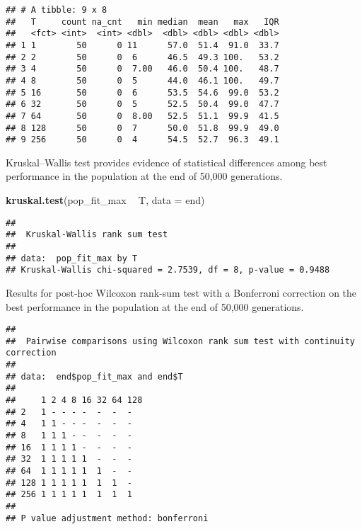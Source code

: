 \documentclass[]{book}
\newenvironment{Shaded}{\begin{snugshade}}{\end{snugshade}}
\newcommand{\DataTypeTok}[1]{\textcolor[rgb]{0.13,0.29,0.53}{#1}}
\newcommand{\KeywordTok}[1]{\textcolor[rgb]{0.13,0.29,0.53}{\textbf{#1}}}
\newcommand{\NormalTok}[1]{#1}
\newcommand{\OperatorTok}[1]{\textcolor[rgb]{0.81,0.36,0.00}{\textbf{#1}}}
\newcommand{\OtherTok}[1]{\textcolor[rgb]{0.56,0.35,0.01}{#1}}
\newcommand{\StringTok}[1]{\textcolor[rgb]{0.31,0.60,0.02}{#1}}
\begin{document}
\begin{verbatim}
## # A tibble: 9 x 8
##   T     count na_cnt   min median  mean   max   IQR
##   <fct> <int>  <int> <dbl>  <dbl> <dbl> <dbl> <dbl>
## 1 1        50      0 11      57.0  51.4  91.0  33.7
## 2 2        50      0  6      46.5  49.3 100.   53.2
## 3 4        50      0  7.00   46.0  50.4 100.   48.7
## 4 8        50      0  5      44.0  46.1 100.   49.7
## 5 16       50      0  6      53.5  54.6  99.0  53.2
## 6 32       50      0  5      52.5  50.4  99.0  47.7
## 7 64       50      0  8.00   52.5  51.1  99.9  41.5
## 8 128      50      0  7      50.0  51.8  99.9  49.0
## 9 256      50      0  4      54.5  52.7  96.3  49.1
\end{verbatim}

Kruskal--Wallis test provides evidence of statistical differences among best performance in the population at the end of 50,000 generations.

\begin{Shaded}
\begin{Highlighting}[]
\KeywordTok{kruskal.test}\NormalTok{(pop_fit_max }\OperatorTok{~}\StringTok{ }\NormalTok{T, }\DataTypeTok{data =}\NormalTok{ end)}
\end{Highlighting}
\end{Shaded}

\begin{verbatim}
## 
##  Kruskal-Wallis rank sum test
## 
## data:  pop_fit_max by T
## Kruskal-Wallis chi-squared = 2.7539, df = 8, p-value = 0.9488
\end{verbatim}

Results for post-hoc Wilcoxon rank-sum test with a Bonferroni correction on the best performance in the population at the end of 50,000 generations.

\begin{Shaded}
\end{Shaded}

\begin{verbatim}
## 
##  Pairwise comparisons using Wilcoxon rank sum test with continuity correction 
## 
## data:  end$pop_fit_max and end$T 
## 
##     1 2 4 8 16 32 64 128
## 2   1 - - - -  -  -  -  
## 4   1 1 - - -  -  -  -  
## 8   1 1 1 - -  -  -  -  
## 16  1 1 1 1 -  -  -  -  
## 32  1 1 1 1 1  -  -  -  
## 64  1 1 1 1 1  1  -  -  
## 128 1 1 1 1 1  1  1  -  
## 256 1 1 1 1 1  1  1  1  
## 
## P value adjustment method: bonferroni
\end{verbatim}
\end{document}
